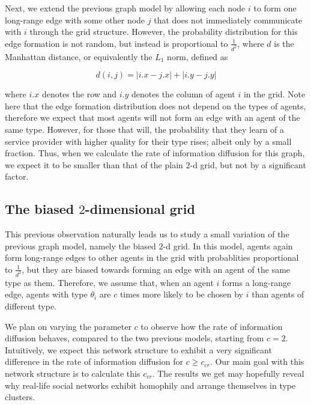 \documentclass[format=acmsmall, review=false]{acmart}
\begin{document}
\par Next, we extend the previous graph model by allowing each node $i$ to form one long-range edge with some other node $j$ that
does not immediately communicate with $i$ through the grid structure. However, the probability distribution for this edge
formation is not random, but instead is proportional to $\frac{1}{d^2}$, where $d$ is the Manhattan distance, or equivalently
the $L_1$ norm, defined as

\[
d(i, j) = |i.x - j.x| + |i.y - j.y|
\]

where $i.x$ denotes the row and $i.y$ denotes the column of agent $i$ in the grid. Note here that the edge formation
distribution does not depend on the types of agents, therefore we expect that most agents will not form an edge with
an agent of the same type. However, for those that will, the probability that they learn of a service provider with higher
quality for their type rises; albeit only by a small fraction. Thus, when we calculate the rate of information diffusion for
this graph, we expect it to be smaller than that of the plain $2$-d grid, but not by a significant factor.

\subsection{The biased $2$-dimensional grid}

\par This previous observation naturally leads us to study a small variation of the previous graph model, namely the biased
$2$-d grid. In this model, agents again form long-range edges to other agents in the grid with probablities proportional
to $\frac{1}{d^2}$, but they are biased towards forming an edge with an agent of the same type as them. Therefore, we
assume that, when an agent $i$ forms a long-range edge, agents with type $\theta_i$ are $c$ times more likely to be chosen
by $i$ than agents of different type.

\par We plan on varying the parameter $c$ to observe how the rate of information diffusion behaves, compared to the two
previous models, starting from $c = 2$. Intuitively, we expect this network structure to exhibit a very significant
difference in the rate of information diffusion for $c \geq c_{cr}$. Our main goal with this network structure is to
calculate this $c_{cr}$. The results we get may hopefully reveal why real-life social networks exhibit homophily and
arrange themselves in type clusters.
\end{document}
